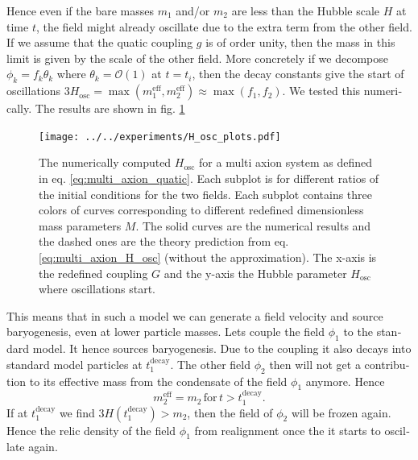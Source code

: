 \documentclass[master,       %
               twoside,        %
               BCOR10mm,       %
               english,ngerman, %
               ]{GAUBM}
\begin{document}
\begin{otherlanguage}{english}
Hence even if the bare masses $m_1$ and/or $m_2$ are less than the Hubble scale $H$ at time $t$, the field might already oscillate due to the extra term from the other field. If we assume that the quatic coupling $g$ is of order unity, then the mass in this limit is given by the scale of the other field.
More concretely if we decompose $\phi_k = f_k \theta_k$ where $\theta_k = \mathcal{O}(1)$ at $t = t_i$, then
the decay constants give the start of oscillations
$3 H_\mathrm{osc} = \max(m_1^\mathrm{eff}, m_2^\mathrm{eff}) \approx \max(f_1, f_2)$.
We tested this numerically. The results are shown in fig. \ref{fig:multi_axion_quatic_H_osc}
\begin{figure}[H]
	\texttt{[image: ../../experiments/H\_osc\_plots.pdf]}
	\caption{The numerically computed $H_\mathrm{osc}$ for a multi axion system as defined in eq. \eqref{eq:multi_axion_quatic}. Each subplot is for different ratios of the initial conditions for the two fields. Each subplot contains three colors of curves corresponding to different redefined dimensionless mass parameters $M$. The solid curves are the numerical results and the dashed ones are the theory prediction from eq. \eqref{eq:multi_axion_H_osc} (without the approximation). The x-axis is the redefined coupling $G$ and the y-axis the Hubble parameter $H_\mathrm{osc}$ where oscillations start.}
	\label{fig:multi_axion_quatic_H_osc}
\end{figure}

This means that in such a model we can generate a field velocity and source baryogenesis, even at lower particle masses. Lets couple the field $\phi_1$ to the standard model.
It hence sources baryogenesis. Due to the coupling it also decays into standard model particles at $t_1^\mathrm{decay}$.
The other field $\phi_2$ then will not get a contribution to its effective mass from the condensate of the field $\phi_1$ anymore. Hence
\begin{equation}
	m_2^\mathrm{eff} = m_2 \, \mathrm{for} \, t > t_1^\mathrm{decay}.
\end{equation}
If at $t_1^\mathrm{decay}$ we find $3 H(t_1^\mathrm{decay}) > m_2$, then the field of $\phi_2$ will be frozen again.
Hence the relic density of the field $\phi_1$ from realignment once the it starts to oscillate again.


\end{otherlanguage}
\end{document}
